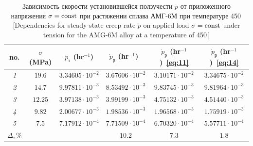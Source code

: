 \begin{table}[b!]



\centering
\footnotesize
\caption{Зависимость скорости установившейся ползучести $\dot{p}$ от приложенного напряжения $\sigma={\rm const}$ при растяжении сплава АМГ-6М при температуре 450\,\textcelsius
 \label{tab:AMG6M/dot_p} 
[Dependencies for steady-state creep rate $\dot{p}$ on applied load $\sigma={\rm const}$ under tension for the AMG-6M alloy at a temperature of 450\,\textcelsius]}
\vspace{-3mm}	
\renewcommand{\tabcolsep}{0.28cm}
\begin{tabular}{c|c|c|c|c|c} 
	\hline 
\rule{0mm}{12pt}%
\footnotesize no. & 
\footnotesize $\sigma$ (MPa) &
\footnotesize  $\dot{p}_\text{э}$ (hr$^{-1}$) &
\footnotesize  $\dot{p}_\text{р}$ (hr$^{-1}$)~\cite{Larichkin} &
\footnotesize  $\dot{p}_\text{р}$ (hr$^{-1}$)~\eqref{eq:11}  &
\footnotesize  $\dot{p}_\text{р}$ (hr$^{-1}$)~\eqref{eq:14} \\ 
	\hline
\rule{0mm}{12pt}%
\sl 1 & $19.6$ & $3.34605 \cdot 10^{-2}$ & $3.67606 \cdot 10^{-2}$ & $3.10171 \cdot 10^{-2}$ & $3.34675 \cdot 10^{-2}$	\\
\sl 2 & $14.7$ & $9.97811 \cdot 10^{-3}$ & $8.53492 \cdot 10^{-3}$ & $9.83745 \cdot 10^{-3}$ & $9.81964 \cdot 10^{-3}$	\\
\sl 3 & $12.25$ & $3.97138 \cdot 10^{-3}$ & $3.99199 \cdot 10^{-3}$ & $4.75132 \cdot 10^{-3}$ & $4.51440 \cdot 10^{-3}$	\\
\sl 4 & $9.82$ & $2.00677 \cdot 10^{-3}$ & $1.98536 \cdot 10^{-3}$ & $1.96568 \cdot 10^{-3}$ & $1.75919 \cdot 10^{-3}$	\\
\sl 5 & $7.5$ & $7.17912 \cdot 10^{-4}$ & $7.71509 \cdot 10^{-4}$ & $6.70320 \cdot 10^{-4}$ & $5.57711 \cdot 10^{-4}$	\\ 
\hline 
\rule{0mm}{12pt}%
	$\Delta, \%$ & \multicolumn{1}{c}{} & & $10.2$ & $7.3$ & $1.8$	\\ 
	\hline 
\end{tabular}



\end{table}

\smallskip

